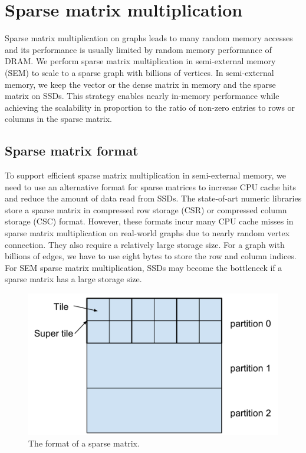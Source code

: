 \section{Sparse matrix multiplication}
Sparse matrix multiplication on graphs leads to many random memory
accesses and its performance is usually limited by random memory performance
of DRAM. We perform sparse matrix multiplication in semi-external memory (SEM)
to scale to a sparse graph with billions of vertices. In semi-external memory,
we keep the vector or the dense matrix in memory and the sparse matrix on SSDs.
This strategy enables nearly in-memory performance while achieving
the scalability in proportion to the ratio of non-zero entries to rows or columns
in the sparse matrix.

\subsection{Sparse matrix format}
To support efficient sparse matrix multiplication in semi-external memory,
we need to use an alternative format for sparse matrices to increase CPU cache
hits and reduce the amount of data read from SSDs.
The state-of-art numeric libraries store a sparse matrix in compressed row storage
(CSR) or compressed column storage (CSC) format. However, these formats incur
many CPU cache misses in sparse matrix multiplication on real-world graphs
due to nearly random vertex connection. They also require a relatively
large storage size. For a graph with billions of edges, we have to use eight
bytes to store the row and column indices. For SEM sparse
matrix multiplication, SSDs may become the bottleneck if a sparse matrix has
a large storage size.

\begin{figure}
\centering
\includegraphics[scale=0.3]{./sparse_mat.pdf}
\caption{The format of a sparse matrix.}
\label{sparse_mat}
\end{figure}

